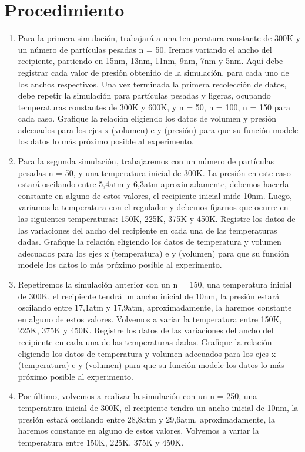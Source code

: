 \documentclass[]{article}
\begin{document}
\section{Procedimiento}
\begin{enumerate}
    \item Para la primera simulación, trabajará a una temperatura constante de 300K y un número de partículas pesadas n = 50. Iremos variando el ancho del recipiente, partiendo en 15nm, 13nm, 11nm,
    9nm, 7nm y 5nm. Aquí debe registrar cada valor de presión obtenido de la simulación, para cada
    uno de los anchos respectivos.
    Una vez terminada la primera recolección de datos, debe repetir la simulación para partículas pesadas y ligeras, ocupando temperaturas constantes de 300K y 600K, y n = 50, n = 100, n = 150
    para cada caso. Grafique la relación eligiendo los datos de volumen y presión adecuados para los 
    ejes x (volumen) e y (presión) para que su función modele los datos lo más próximo posible al 
    experimento.

    \item Para la segunda simulación, trabajaremos con un número de partículas pesadas n = 50, y una
    temperatura inicial de 300K. La presión en este caso estará oscilando entre 5,4atm y 6,3atm
    aproximadamente, debemos hacerla constante en alguno de estos valores, el recipiente inicial mide 10nm. Luego, 
    variamos la temperatura con el regulador y debemos fijarnos que ocurre en las siguientes temperaturas: 
    150K, 225K, 375K y 450K. Registre los datos de las variaciones del ancho del recipiente en cada una de las temperaturas dadas.
    Grafique la relación eligiendo los datos de temperatura y volumen adecuados para los ejes x (temperatura) e y (volumen) para que su función modele los datos lo más 
    próximo posible al experimento.

    \item Repetiremos la simulación anterior con un  n = 150, una temperatura inicial de 300K, el recipiente
    tendrá un ancho inicial de 10nm, la presión estará oscilando entre 17,1atm y 17,9atm, aproximadamente, la haremos constante
    en alguno de estos valores. Volvemos a variar la temperatura entre 150K, 225K, 375K y 450K. Registre los datos de las variaciones 
    del ancho del recipiente en cada una de las temperaturas dadas.
    Grafique la relación eligiendo los datos de temperatura y volumen adecuados para los ejes x (temperatura) e y (volumen) para que 
    su función modele los datos lo más próximo posible al experimento.

    \item  Por último, volvemos a realizar la simulación con un n = 250, una temperatura inicial de 300K, el
    recipiente tendra un ancho inicial de 10nm, la presión estará oscilando entre 28,8atm y 29,6atm,
    aproximadamente, la haremos constante en alguno de estos valores. Volvemos a variar la temperatura entre 
    150K, 225K, 375K y 450K.
    
    
\end{enumerate}
\end{document}
